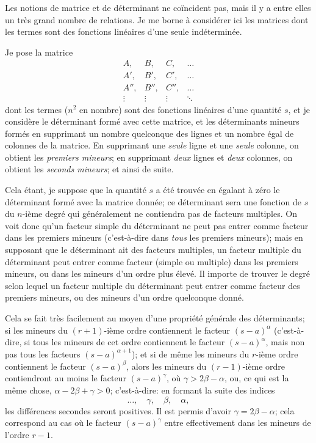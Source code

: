 \documentclass[11pt,a4paper]{book}
\begin{document}
Les notions de matrice et de d\'{e}terminant ne co\"{i}ncident pas, mais il y a entre elles un tr\`{e}s grand nombre de relations. Je me borne \`{a} consid\'{e}rer ici les matrices dont les termes sont des fonctions lin\'{e}aires d'une seule ind\'{e}termin\'{e}e.

Je pose la matrice
\[
\begin{matrix}
A, & B, & C, & \ldots \\
A', & B', & C', & \ldots \\
A'', & B'', & C'', & \ldots \\
\vdots & \vdots & \vdots & \ddots
\end{matrix}
\]
dont les termes ($n^2$ en nombre) sont des fonctions lin\'{e}aires d'une quantit\'{e} $s$, et je consid\`{e}re le d\'{e}terminant form\'{e} avec cette matrice, et les d\'{e}terminants mineurs form\'{e}s en supprimant un nombre quelconque des lignes et un nombre \'{e}gal de colonnes de la matrice. En supprimant une \textit{seule} ligne et une \textit{seule} colonne, on obtient les \textit{premiers mineurs}; en supprimant \textit{deux} lignes et \textit{deux} colonnes, on obtient les \textit{seconds mineurs}; et ainsi de suite.

Cela \'{e}tant, je suppose que la quantit\'{e} $s$ a \'{e}t\'{e} trouv\'{e}e en \'{e}galant \`{a} z\'{e}ro le d\'{e}terminant form\'{e} avec la matrice donn\'{e}e; ce d\'{e}terminant sera une fonction de $s$ du $n$-i\`{e}me degr\'{e} qui g\'{e}n\'{e}ralement ne contiendra pas de facteurs multiples. On voit donc qu'un facteur simple du d\'{e}terminant ne peut pas entrer comme facteur dans les premiers mineurs (c'est-\`{a}-dire dans \textit{tous} les premiers mineurs); mais en supposant que le d\'{e}terminant ait des facteurs multiples, un facteur multiple du d\'{e}terminant peut entrer comme facteur (simple ou multiple) dans les premiers mineurs, ou dans les mineurs d'un ordre plus \'{e}lev\'{e}. Il importe de trouver le degr\'{e} selon lequel un facteur multiple du d\'{e}terminant peut entrer comme facteur des premiers mineurs, ou des mineurs d'un ordre quelconque donn\'{e}.

Cela se fait tr\`{e}s facilement au moyen d'une propri\'{e}t\'{e} g\'{e}n\'{e}rale des d\'{e}terminants; si les mineurs du $(r+1)$-i\`{e}me ordre contiennent le facteur $(s-a)^{\alpha}$ (c'est-\`{a}-dire, si tous les mineurs de cet ordre contiennent le facteur $(s-a)^{\alpha}$, mais non pas tous les facteurs $(s-a)^{\alpha+1}$); et si de m\^{e}me les mineurs du $r$-i\`{e}me ordre contiennent le facteur $(s-a)^{\beta}$, alors les mineurs du $(r-1)$-i\`{e}me ordre contiendront au moins le facteur $(s-a)^{\gamma}$, o\`{u} $\gamma > 2\beta - \alpha$, ou, ce qui est la m\^{e}me chose, $\alpha - 2\beta + \gamma > 0$; c'est-\`{a}-dire: en formant la suite des indices
\[
\ldots,\quad \gamma,\quad \beta,\quad \alpha,
\]
les diff\'{e}rences secondes seront positives. Il est permis d'avoir $\gamma = 2\beta - \alpha$; cela correspond au cas o\`{u} le facteur $(s-a)^{\gamma}$ entre effectivement dans les mineurs de l'ordre $r-1$.
\end{document}
